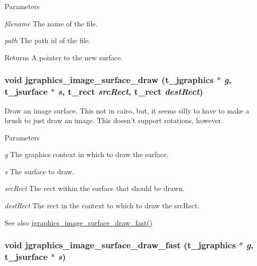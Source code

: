 \begin{DoxyParams}{Parameters}
\item[{\em filename}]The name of the file. \item[{\em path}]The path id of the file. \end{DoxyParams}
\begin{DoxyReturn}{Returns}
A pointer to the new surface. 
\end{DoxyReturn}
\hypertarget{group__jsurface_gab6b97ae8202c210ccec29ec2b8c4f5d0}{
\subsubsection[{jgraphics\_\-image\_\-surface\_\-draw}]{\setlength{\rightskip}{0pt plus 5cm}void jgraphics\_\-image\_\-surface\_\-draw ({\bf t\_\-jgraphics} $\ast$ {\em g}, \/  {\bf t\_\-jsurface} $\ast$ {\em s}, \/  {\bf t\_\-rect} {\em srcRect}, \/  {\bf t\_\-rect} {\em destRect})}}
\label{group__jsurface_gab6b97ae8202c210ccec29ec2b8c4f5d0}


Draw an image surface. This not in cairo, but, it seems silly to have to make a brush to just draw an image. This doesn't support rotations, however.


\begin{DoxyParams}{Parameters}
\item[{\em g}]The graphics context in which to draw the surface. \item[{\em s}]The surface to draw. \item[{\em srcRect}]The rect within the surface that should be drawn. \item[{\em destRect}]The rect in the context to which to draw the srcRect. \end{DoxyParams}
\begin{DoxySeeAlso}{See also}
\hyperlink{group__jsurface_ga766ec5ca1b93fa9b0f3b05c49122f62c}{jgraphics\_\-image\_\-surface\_\-draw\_\-fast()} 
\end{DoxySeeAlso}
\hypertarget{group__jsurface_ga766ec5ca1b93fa9b0f3b05c49122f62c}{
\subsubsection[{jgraphics\_\-image\_\-surface\_\-draw\_\-fast}]{\setlength{\rightskip}{0pt plus 5cm}void jgraphics\_\-image\_\-surface\_\-draw\_\-fast ({\bf t\_\-jgraphics} $\ast$ {\em g}, \/  {\bf t\_\-jsurface} $\ast$ {\em s})}}
\label{group__jsurface_ga766ec5ca1b93fa9b0f3b05c49122f62c}


